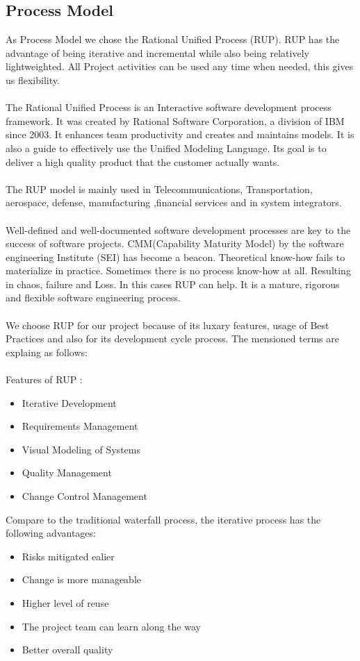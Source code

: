 \documentclass[
	11pt,
	a4paper
]{article}%
\begin{document}
\subsection{Process Model}
As Process Model we chose the Rational Unified Process (RUP). RUP has the advantage of being iterative and incremental while also being relatively lightweighted. All Project activities can be used any time when needed, this gives us flexibility.
\\\\
The Rational Unified Process is an Interactive software development process framework. It was created by Rational Software Corporation, a division of IBM since 2003. It enhances team productivity and creates and maintains models. It is also a guide to effectively use the Unified Modeling Language. Its goal is to deliver a high quality product that the customer actually wants.
\\\\
The RUP model is mainly used in Telecommunications, Transportation, aerospace, defense, manufacturing ,financial services and in system integrators.
\\\\
Well-defined and well-documented software development processes are key to the success of software projects. CMM(Capability Maturity Model) by the software engineering Institute (SEI) has become a beacon. Theoretical know-how fails to materialize in practice. Sometimes there is no process know-how at all. Resulting in chaos, failure and Loss. In this cases RUP can help. It is a mature, rigorous and flexible software engineering process.
\\\\
We choose RUP for our project because of its luxary features, usage of Best Practices and also for its development cycle process. The mensioned terms are explaing as follows:
\\\\
Features of RUP :
\begin{itemize}
\item Iterative Development
\item Requirements Management
\item Visual Modeling of Systems
\item Quality Management
\item Change Control Management
\end{itemize}

Compare to the traditional waterfall process, the iterative process has the following advantages:
\begin{itemize}
\item Risks mitigated ealier
\item Change is more manageable
\item Higher level of reuse
\item The project team can learn along the way
\item Better overall quality
\end{itemize}
\end{document}
